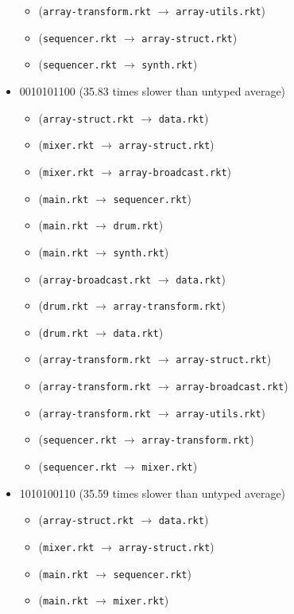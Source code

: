 \documentclass{article}
\newcommand{\mono}[1]{\texttt{#1}}
\begin{document}
\begin{itemize}
\begin{itemize}
  \item (\mono{array-transform.rkt} $\rightarrow$ \mono{array-utils.rkt})
  \item (\mono{sequencer.rkt} $\rightarrow$ \mono{array-struct.rkt})
  \item (\mono{sequencer.rkt} $\rightarrow$ \mono{synth.rkt})
  \end{itemize}
\item 0010101100 (35.83 times slower than untyped average)
  \begin{itemize}
  \item (\mono{array-struct.rkt} $\rightarrow$ \mono{data.rkt})
  \item (\mono{mixer.rkt} $\rightarrow$ \mono{array-struct.rkt})
  \item (\mono{mixer.rkt} $\rightarrow$ \mono{array-broadcast.rkt})
  \item (\mono{main.rkt} $\rightarrow$ \mono{sequencer.rkt})
  \item (\mono{main.rkt} $\rightarrow$ \mono{drum.rkt})
  \item (\mono{main.rkt} $\rightarrow$ \mono{synth.rkt})
  \item (\mono{array-broadcast.rkt} $\rightarrow$ \mono{data.rkt})
  \item (\mono{drum.rkt} $\rightarrow$ \mono{array-transform.rkt})
  \item (\mono{drum.rkt} $\rightarrow$ \mono{data.rkt})
  \item (\mono{array-transform.rkt} $\rightarrow$ \mono{array-struct.rkt})
  \item (\mono{array-transform.rkt} $\rightarrow$ \mono{array-broadcast.rkt})
  \item (\mono{array-transform.rkt} $\rightarrow$ \mono{array-utils.rkt})
  \item (\mono{sequencer.rkt} $\rightarrow$ \mono{array-transform.rkt})
  \item (\mono{sequencer.rkt} $\rightarrow$ \mono{mixer.rkt})
  \end{itemize}
\item 1010100110 (35.59 times slower than untyped average)
  \begin{itemize}
  \item (\mono{array-struct.rkt} $\rightarrow$ \mono{data.rkt})
  \item (\mono{mixer.rkt} $\rightarrow$ \mono{array-struct.rkt})
  \item (\mono{main.rkt} $\rightarrow$ \mono{sequencer.rkt})
  \item (\mono{main.rkt} $\rightarrow$ \mono{mixer.rkt})

\end{itemize}
\end{itemize}
\end{document}
